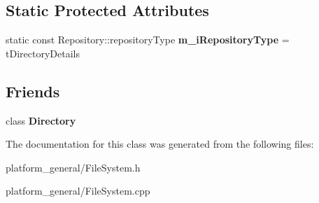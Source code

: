\subsection*{\-Static \-Protected \-Attributes}
\begin{DoxyCompactItemize}
\item 
\hypertarget{classgeneral__server_1_1DirectoryDetails_a7106f1964a5504eed023bef3e2e9a97d}{static const \*
\-Repository\-::repository\-Type {\bfseries m\-\_\-i\-Repository\-Type} = t\-Directory\-Details}\label{classgeneral__server_1_1DirectoryDetails_a7106f1964a5504eed023bef3e2e9a97d}

\end{DoxyCompactItemize}
\subsection*{\-Friends}
\begin{DoxyCompactItemize}
\item 
\hypertarget{classgeneral__server_1_1DirectoryDetails_a245303e8660be5fb8eb2828a8c44b773}{class {\bfseries \-Directory}}\label{classgeneral__server_1_1DirectoryDetails_a245303e8660be5fb8eb2828a8c44b773}

\end{DoxyCompactItemize}


\-The documentation for this class was generated from the following files\-:\begin{DoxyCompactItemize}
\item 
platform\-\_\-general/\-File\-System.\-h\item 
platform\-\_\-general/\-File\-System.\-cpp\end{DoxyCompactItemize}
